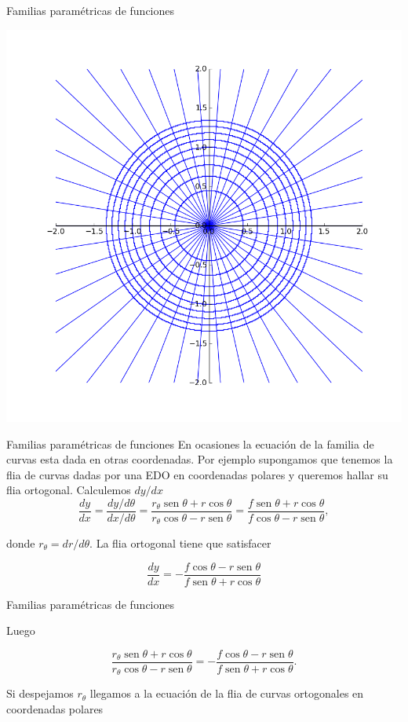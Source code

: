 \documentclass[handout,hyperref={colorlinks=true}]{beamer}
\DeclareMathOperator{\sen}{sen}
\begin{document}
\begin{frame}[fragile]{Familias paramétricas de funciones} 
\begin{center}
\includegraphics[scale=.3]{imagenes/flia_curvas_ortogonales.png}
\end{center}
\end{frame}


\begin{frame}[fragile]{Familias paramétricas de funciones} 
En ocasiones la ecuación de la familia de curvas esta dada en otras coordenadas. Por ejemplo supongamos que tenemos la flia de curvas dadas por una EDO en coordenadas polares
y queremos hallar su flia ortogonal. Calculemos $dy/dx$
\[\frac{dy}{dx}=\frac{dy/d\theta}{dx/d\theta}=\frac{r_{\theta}\sen\theta+r\cos\theta}{r_{\theta}\cos\theta-r\sen\theta}=\frac{f\sen\theta+r\cos\theta}{f\cos\theta-r\sen\theta},\]

donde $r_{\theta}=dr/d\theta$. La flia ortogonal tiene que satisfacer

\[\frac{dy}{dx}=-\frac{f\cos\theta-r\sen\theta}{f\sen\theta+r\cos\theta}\]


\end{frame}


\begin{frame}[fragile]{Familias paramétricas de funciones} 

Luego

\[\frac{r_{\theta}\sen\theta+r\cos\theta}{r_{\theta}\cos\theta-r\sen\theta}=-\frac{f\cos\theta-r\sen\theta}{f\sen\theta+r\cos\theta}.\]

Si despejamos $r_{\theta}$ llegamos a la ecuación de la flia de curvas ortogonales en coordenadas polares



\end{frame}
\end{document}
